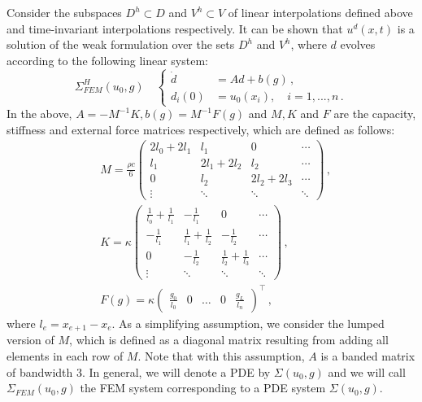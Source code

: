 \documentclass[letterpaper, 10 pt, conference]{ieeeconf/ieeeconf}
\begin{document}
Consider the subspaces $D^h \subset D$ and $V^h \subset V$ of linear
interpolations defined above and time-invariant interpolations respectively.
It can be shown that $u^d(x, t)$ is a solution of the weak formulation over the
sets $D^h$ and $V^h$, where $d$ evolves
according to the following linear system:
%
\begin{equation}\label{eq:fem}
    \Sigma^H_{FEM}(u_0, g) \quad \left \{
    \begin{aligned}
        \dot{d} &= A d + b(g) \,, \\
        d_i(0) &= u_0(x_i), \quad i = 1,...,n \,.
    \end{aligned}
    \right.
\end{equation}
%
In the above, $A = -M^{-1}K, b(g) = M^{-1} F(g)$ and $M, K$ and $F$ are the capacity,
stiffness and external force matrices respectively, which are defined as
follows:
%
    \begin{align}
        &M = \frac{\rho c}{6} \begin{pmatrix}
            2 l_0 + 2 l_1 & l_1  & 0 & \cdots \\ 
            l_1 & 2 l_1 + 2 l_2 & l_2  & \cdots \\ 
            0 & l_2 & 2 l_2 + 2 l_3 &  \cdots \\ 
            \vdots & \ddots & \ddots & \ddots 
        \end{pmatrix} \,, \label{eq:matrices_M} \\
        &K = \kappa \begin{pmatrix}
            \frac{1}{l_0} + \frac{1}{l_1} & -\frac{1}{l_1}  & 0 & \cdots \\ 
            -\frac{1}{l_1} & \frac{1}{l_1} + \frac{1}{l_2} & -\frac{1}{l_2}  & \cdots \\ 
            0 & -\frac{1}{l_2} & \frac{1}{l_2} + \frac{1}{l_3} &  \cdots \\ 
            \vdots & \ddots & \ddots & \ddots 
        \end{pmatrix} \,, \label{eq:matrices_K}\\
        &F(g) = \kappa \begin{pmatrix}
            \frac{g_0}{l_0} & 0 & \hdots & 0 & \frac{g_L}{l_n}
        \end{pmatrix}^\top \,, \label{eq:matrices_F}
    \end{align}
%
where $l_e = x_{e+1} - x_e$. As a simplifying assumption, we consider the lumped
version of $M$, which is defined as a diagonal matrix resulting from adding all
elements in each row of $M$. Note that with this assumption, $A$ is a banded
matrix of bandwidth 3. In general, we will denote a PDE by $\Sigma(u_0, g)$
and we will call $\Sigma_{FEM}(u_0, g)$ the FEM system corresponding to a PDE system
$\Sigma(u_0, g)$.
\end{document}
